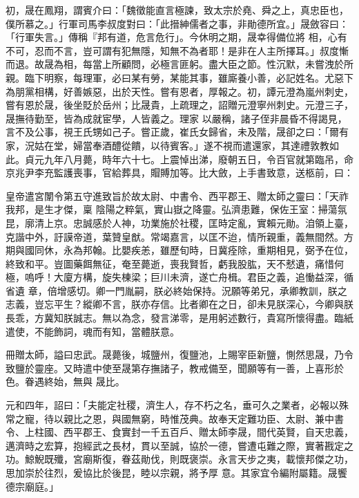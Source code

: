 \begin{pinyinscope}
 初，晟在鳳翔，謂賓介曰：「魏徵能直言極諫，致太宗於堯、舜之上，真忠臣也，僕所慕之。」行軍司馬李叔度對曰：「此搢紳儒者之事，非勛德所宜。」晟斂容曰：「行軍失言。」傳稱『邦有道，危言危行」。今休明之期，晟幸得備位將
 相，心有不可，忍而不言，豈可謂有犯無隱，知無不為者耶！是非在人主所擇耳。」叔度慚而退。故晟為相，每當上所顧問，必極言匪躬。盡大臣之節。性沉默，未嘗洩於所親。臨下明察，每理軍，必曰某有勞，某能其事，雖廝養小善，必記姓名。尤惡下為朋黨相構，好善嫉惡，出於天性。嘗有恩者，厚報之。初，譚元澄為嵐州刺史，嘗有恩於晟，後坐貶於岳州；比晟貴，上疏理之，詔贈元澄寧州刺史。元澄三子，晟撫待勤至，皆為成就宦學，人皆義之。理家
 以嚴稱，諸子侄非晨昏不得謁見，言不及公事，視王氏甥如己子。嘗正歲，崔氏女歸省，未及階，晟卻之曰：「爾有家，況姑在堂，婦當奉酒醴從饋，以待賓客。」遂不視而遣還家，其達禮敦教如此。貞元九年八月薨，時年六十七。上震悼出涕，廢朝五日，令百官就第臨吊，命京兆尹李充監護喪事，官給葬具，賵賻加等。比大斂，上手書致意，送柩前，曰：



 皇帝遣宮闈令第五守進致旨於故太尉、中書令、西平郡王、贈太師之靈曰：「天祚我邦，是生才傑，稟
 陰陽之粹氣，實山嶽之降靈。弘濟患難，保佐王室：掃蕩氛昆，廓清上京。忠誠感於人神，功業施於社稷，匡時定亂，實賴元勛。洎領上臺，克諧中外，訏謨帝道，葉贊皇猷。常竭嘉言，以匡不迨，情所親重，義無間然。方期與國同休，永為邦翰。比嬰疾恙，雖歷旬時，日冀痊除，重期相見，弼予在位，終致和平。豈圖藥餌無征，奄至薨逝，喪我賢哲，虧我股肱，天不憖遺，痛惜何極，嗚呼！大廈方構，旋失棟梁；巨川未濟，遂亡舟楫。君臣之義，追慟益深，循省遺
 章，倍增感切。卿一門胤嗣，朕必終始保持。況願等弟兄，承卿教訓，朕之志義，豈忘平生？縱卿不言，朕亦存信。比者卿在之日，卻未見朕深心，今卿與朕長乖，方冀知朕誠志。無以為念，發言涕零，是用躬述數行，貴寫所懷得盡。臨紙遣使，不能飾詞，魂而有知，當體朕意。



 冊贈太師，謚曰忠武。晟薨後，城鹽州，復鹽池，上賜宰臣新鹽，惻然思晟，乃令致鹽於靈座。又時遣中使至晟第存撫諸子，教戒備至，聞願等有一善，上喜形於色。眷遇終始，無與
 晟比。



 元和四年，詔曰：「夫能定社稷，濟生人，存不朽之名，垂可久之業者，必報以殊常之寵，待以親比之恩，與國無窮，時惟茂典。故奉天定難功臣、太尉、兼中書令、上柱國、西平郡王、食實封一千五百戶、贈太師李晟，間代英賢，自天忠義，邁濟時之宏算，抱經武之長材，貫以至誠，協於一德，嘗遭屯難之際，實著戡定之功。鯨鯢既殲，宮廟斯復，眷茲勛伐，則既褒崇。永言天步之夷，載懷邦傑之功，思加崇於往烈，爰協比於後昆，睦以宗親，將予厚
 意。其家宜令編附屬籍。晟饗德宗廟庭。」




\end{pinyinscope}

